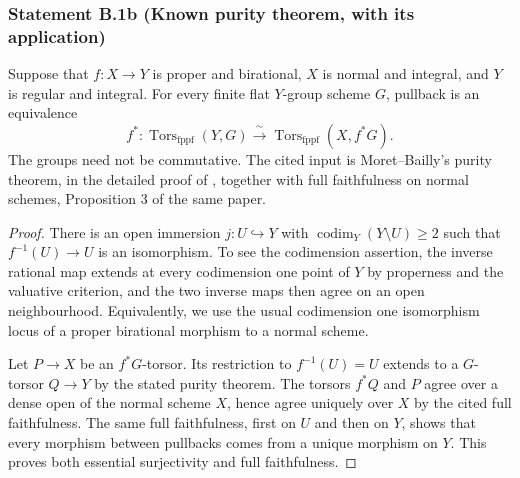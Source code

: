 \subsubsection*{Statement B.1b (Known purity theorem, with its application)}
Suppose that $f:X\to Y$ is proper and birational, $X$ is normal and
integral, and $Y$ is regular and integral.  For every finite flat
$Y$-group scheme $G$, pullback is an equivalence
\[
 f^*: \operatorname{Tors}_{\mathrm{fppf}}(Y,G)
 \xrightarrow{\ \sim\ }
 \operatorname{Tors}_{\mathrm{fppf}}(X,f^*G).
 \tag{B.1.1}
\]
The groups need not be commutative.  The cited input is Moret--Bailly's
purity theorem, in the detailed proof of
\cite[Theorem 6, pp.~433--434]{Marrama2026}, together with full
faithfulness on normal schemes, Proposition 3 of the same paper.
\begin{proof}
There is an open immersion $j:U\hookrightarrow Y$ with
$\operatorname{codim}_Y(Y\setminus U)\geq2$ such that
$f^{-1}(U)\to U$ is an isomorphism.  To see the codimension assertion,
the inverse rational map extends at every codimension one point of
$Y$ by properness and the valuative criterion, and the two inverse
maps then agree on an open neighbourhood.  Equivalently, we use the
usual codimension one isomorphism locus of a proper birational
morphism to a normal scheme.

Let $P\to X$ be an $f^*G$-torsor.  Its restriction to $f^{-1}(U)=U$
extends to a $G$-torsor $Q\to Y$ by the stated purity theorem.  The
torsors $f^*Q$ and $P$ agree over a dense open of the normal scheme
$X$, hence agree uniquely over $X$ by the cited full faithfulness.
The same full faithfulness, first on $U$ and then on $Y$, shows that
every morphism between pullbacks comes from a unique morphism on
$Y$.  This proves both essential surjectivity and full faithfulness.
\end{proof}

